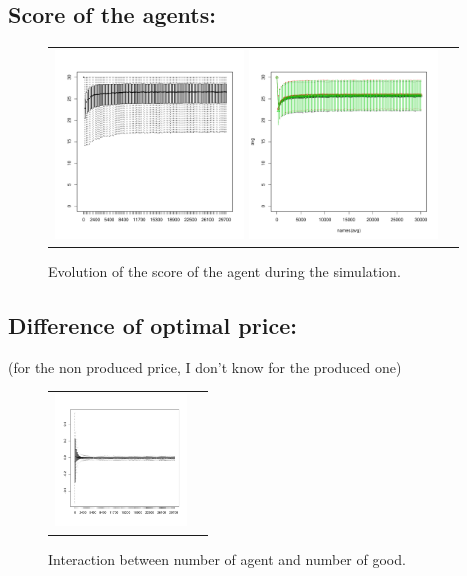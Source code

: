 \documentclass[a4paper]{article}
\begin{document}
\subsection{Score of the agents:}
\begin{figure}[htp]
    \centering
    \begin{tabular}{cc}
	\includegraphics[width=5cm]{boxScoreTime.pdf}
	\includegraphics[width=5cm]{meanEachGroup.pdf}
    \end{tabular}
    \caption{Evolution of the score of the agent during the simulation.}
\end{figure}
\subsection{Difference of optimal price:}
(for the non produced price, I don't know for the produced one)
\begin{figure}[htp]
    \centering
    \begin{tabular}{cc}
	\includegraphics[width=3.5cm]{meanRatio.pdf}
    \end{tabular}
    \caption{Interaction between number of agent and number of good.}
\end{figure}
\end{document}
